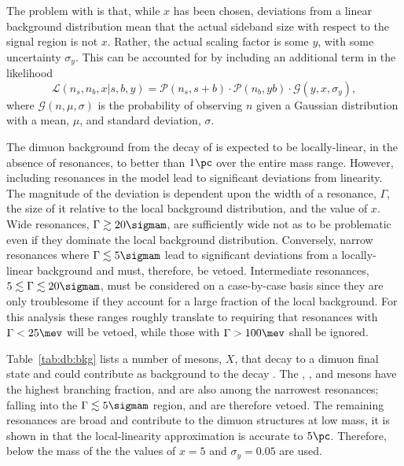 The problem with  is that, while $x$ has been chosen, deviations from a linear
background distribution mean that the actual sideband size with respect to the signal region is not
$x$.
Rather, the actual scaling factor is some $y$, with some uncertainty $\sigma_y$.
This can be accounted for by including an additional term in the likelihood
\begin{equation}
  \mathcal{L}(n_s, n_b, x | s, b, y) =
  \mathcal{P}(n_s, s+b) \cdot
  \mathcal{P}(n_b, yb) \cdot
  \mathcal{G}(y,x,\sigma_y),
  \label{eq:db:like2}
\end{equation}
where $\mathcal{G}(n, \mu, \sigma)$ is the probability of observing $n$ given a Gaussian
distribution with a mean, $\mu$, and standard deviation, $\sigma$.

The dimuon background from the \sm decay of \btokstrmumu is expected to be locally-linear, in the
absence of resonances, to better than $1\pc$ over the entire mass range.
However, including resonances in the model lead to significant deviations from linearity.
The magnitude of the deviation is dependent upon the width of a resonance, $\Gamma$, the size of it
relative to the local background distribution, and the value of $x$.
Wide resonances, $\Gamma\gtrsim20\sigmam$, are sufficiently wide not as to be problematic even if
they dominate the local background distribution.
Conversely, narrow resonances where $\Gamma\lesssim5\sigmam$ lead to significant deviations from a
locally-linear background and must, therefore, be vetoed.
Intermediate resonances, $5\lesssim\Gamma\lesssim20\sigmam$, must be considered on a case-by-case
basis since they are only troublesome if they account for a large fraction of the local background.
For this analysis these ranges roughly translate to requiring that resonances with $\Gamma<25\mev$
will be vetoed, while those with $\Gamma>100\mev$ shall be ignored.

Table~\ref{tab:db:bkg} lists a number of mesons, $X$, that decay to a dimuon final state and could
contribute as background to the decay \decay{\Bd}{\Kstarz\mumu}.
The \phii, \jpsi, and \psitwos mesons have the highest branching fraction, and are also among the
narrowest resonances; falling into the $\Gamma\lesssim5\sigmam$ region, and are therefore vetoed.
The remaining resonances are broad and contribute to the dimuon structures at low mass, it is shown
in  that the local-linearity approximation is accurate to \approx$5\pc$.
Therefore, below the mass of the \jpsi the values of $x=5$ and $\sigma_y=0.05$ are used.

